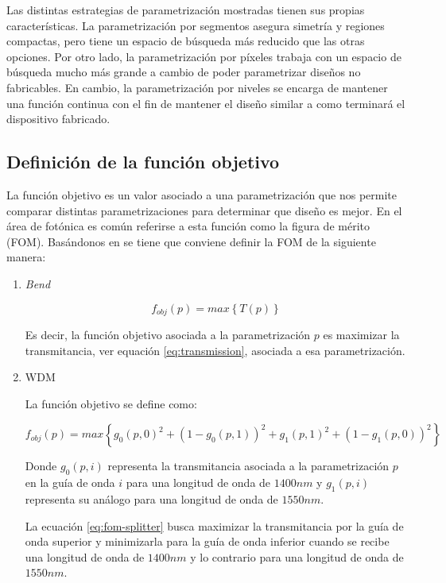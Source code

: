 Las distintas estrategias de parametrización mostradas tienen sus propias características.
La parametrización por segmentos asegura simetría y regiones compactas, pero tiene un espacio de búsqueda más reducido que las otras opciones.
Por otro lado, la parametrización por píxeles trabaja con un espacio de búsqueda mucho más grande a cambio de poder parametrizar diseños no fabricables.
En cambio, la parametrización por niveles se encarga de mantener una función continua con el fin de mantener el diseño similar a como terminará el dispositivo fabricado.

\subsection{Definición de la función objetivo}

La función objetivo es un valor asociado a una parametrización que nos permite comparar distintas parametrizaciones para determinar que diseño es mejor. 
En el área de fotónica es común referirse a esta función como la figura de mérito (FOM). 
Basándonos en \cite{Su2020} se tiene que conviene definir la FOM de la siguiente manera:

\begin{enumerate}

\item \emph{Bend}

\begin{equation}
  f_{obj}(p) = max \left \{ T(p) \right \}
\label{eq:fom-bend}
\end{equation}

Es decir, la función objetivo asociada a la parametrización $p$ es maximizar la transmitancia, ver equación \ref{eq:transmission}, asociada a esa parametrización.

\item WDM

La función objetivo se define como:

\begin{equation}
  f_{obj}(p) = max \left \{ g_0(p, 0)^2 + (1 - g_0(p, 1))^2 + g_1(p, 1)^2 + (1 - g_1(p, 0))^2 \right \}
\label{eq:fom-splitter}
\end{equation}

Donde $g_0(p, i)$ representa la transmitancia asociada a la parametrización $p$ en la guía de onda $i$ para una longitud de onda de $1400 nm$ y 
      $g_1(p, i)$ representa su análogo para una longitud de onda de $1550 nm$.

La ecuación \ref{eq:fom-splitter} busca maximizar la transmitancia por la guía de onda superior y minimizarla para la guía de onda inferior cuando se recibe una longitud de onda de $1400 nm$ y lo contrario para una longitud de onda de $1550 nm$.

\end{enumerate}

